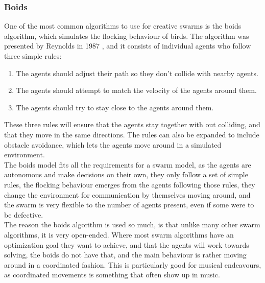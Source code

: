 \documentclass[a4paper,english]{report}
\begin{document}
	\subsubsection{Boids}
	One of the most common algorithms to use for creative swarms is the boids algorithm, which simulates the flocking behaviour of birds. The algorithm was presented by Reynolds in 1987 \cite{reynolds1987flocks}, and it consists of individual agents who follow three simple rules:
	\begin{samepage}\begin{enumerate}
		\item The agents should adjust their path so they don't collide with nearby agents.
		\item The agents should attempt to match the velocity of the agents around them.
		\item The agents should try to stay close to the agents around them.
	\end{enumerate}\end{samepage}
	These three rules will ensure that the agents stay together with out colliding, and that they move in the same directions. The rules can also be expanded to include obstacle avoidance, which lets the agents move around in a simulated environment. \\
	The boids model fits all the requirements for a swarm model, as the agents are autonomous and make decisions on their own, they only follow a set of simple rules, the flocking behaviour emerges from the agents following those rules, they change the environment for communication by themselves moving around, and the swarm is very flexible to the number of agents present, even if some were to be defective.\\
	The reason the boids algorithm is used so much, is that unlike many other swarm algorithms, it is very open-ended. Where most swarm algorithms have an optimization goal they want to achieve, and that the agents will work towards solving, the boids do not have that, and the main behaviour is rather moving around in a coordinated fashion. This is particularly good for musical endeavours, as coordinated movements is something that often show up in music.\\
\end{document}
